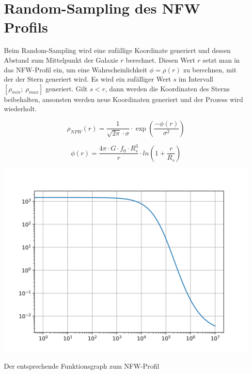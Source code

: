 \section*{Random-Sampling des NFW Profils}

Beim Random-Sampling wird eine zufällige Koordinate generiert und dessen
Abstand zum Mittelpunkt der Galaxie \( r \) berechnet.
Diesen Wert \( r \) setzt man in das NFW-Profil ein, um eine Wahrscheinlichkeit
\( \phi = \rho(r) \) zu berechnen, mit der der Stern generiert wird.
Es wird ein zufälliger Wert \( s \) im Intervall \( [\rho_{min};~\rho_{max}] \)
generiert.
Gilt \( s < r \), dann werden die Koordinaten des Sterns beibehalten,
ansonsten werden neue Koordinaten generiert und der Prozess wird wiederholt.

\begin{center}\vspace{-1cm}
\begin{equation} \label{eq:NFW_profile}
  \rho_{NFW}(r) = \frac{ 1 }{ \sqrt{ 2 \pi } \cdot \sigma } \cdot
  \exp \left( \frac{ -\phi(r) }{ \sigma^{ 2 } } \right)
\end{equation}

\begin{equation}
  \phi(r) = \frac{ 4\pi \cdot G \cdot f_{0} \cdot R_{s}^3 }{ r } \cdot
  ln{ \left( 1 + \frac{ r }{ R_{s} } \right) }
\end{equation}
\end{center}%
%
\begin{center}\vspace{-0.5cm}
\includegraphics[width=0.8\linewidth]{figs/1e6_6}
\caption{Der entsprechende Funktionsgraph zum NFW-Profil}
\label{fig:lookup_NFW}
\end{center}\vspace{-1cm}
